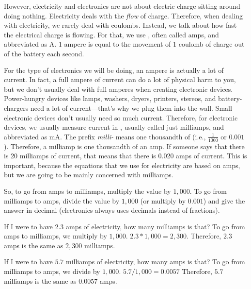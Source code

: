 However, electricity and electronics are not about electric charge sitting around doing nothing.
Electricity deals with the \emph{flow} of charge.
Therefore, when dealing with electricity, we rarely deal with coulombs.
Instead, we talk about how fast the electrical charge is flowing.
For that, we use , often called amps, and abbreviated as A.
1 ampere is equal to the movement of 1 coulomb of charge out of the battery each second.

For the type of electronics we will be doing, an ampere is actually a lot of current.
In fact, a full ampere of current can do a lot of physical harm to you, but we don't usually deal with full amperes when creating electronic devices.
Power-hungry devices like lamps, washers, dryers, printers, stereos, and battery-chargers need a lot of current---that's why we plug them into the wall.
Small electronic devices don't usually need so much current.
Therefore, for electronic devices, we usually measure current in , usually called just milliamps, and abbreviated as mA.
The prefix \emph{milli-} means one thousandth of (i.e., $\frac{1}{1000}$ or $0.001$).
Therefore, a milliamp is one thousandth of an amp.
If someone says that there is 20 milliamps of current, that means that there is 0.020 amps of current.
This is important, because the equations that we use for electricity are based on amps, but we are going to be mainly concerned with milliamps.

So, to go from amps to milliamps, multiply the value by $1,000$.
To go from milliamps to amps, divide the value by $1,000$ (or multiply by $0.001$) and give the answer in decimal (electronics always uses decimals instead of fractions).

\begin{exampleprob}
If I were to have $2.3$ amps of electricity, how many milliamps is that?
To go from amps to milliamps, we multiply by $1,000$.  
$2.3 * 1,000 = 2,300$.  
Therefore, $2.3$ amps is the same as $2,300$ milliamps.
\end{exampleprob}

\begin{exampleprob}
If I were to have $5.7$ milliamps of electricity, how many amps is that?
To go from milliamps to amps, we divide by $1,000$.
$5.7 / 1,000 = 0.0057$
Therefore, $5.7$ milliamps is the same as $0.0057$ amps.
\end{exampleprob}

